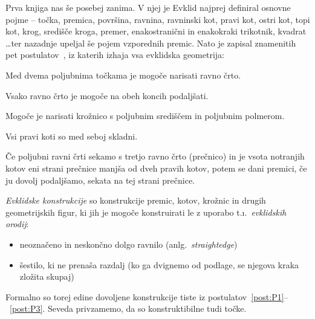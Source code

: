 Prva knjiga nas še posebej zanima. V njej je Evklid najprej definiral osnovne pojme -- točka, premica, površina, ravnina, ravninski kot, pravi kot, ostri kot, topi kot, krog, središče kroga, premer, enakostranični in enakokraki trikotnik, kvadrat \ldots ter nazadnje upeljal še pojem vzporednih premic. Nato je zapisal znamenitih pet postulatov~\cite{euclidI}, iz katerih izhaja vsa evklidska geometrija:

\begin{postulat}
    \label{post:P1}
    Med dvema poljubnima točkama je mogoče narisati ravno črto.
\end{postulat}
\begin{postulat}
    \label{post:P2}
    Vsako ravno črto je mogoče na obeh koncih podaljšati.
\end{postulat}
\begin{postulat}
    \label{post:P3}
    Mogoče je narisati krožnico s poljubnim središčem in poljubnim polmerom.
\end{postulat}
\begin{postulat}
    \label{post:P4}
    Vsi pravi koti so med seboj skladni.
\end{postulat}
\begin{postulat}
    \label{post:P5}
    Če poljubni ravni črti sekamo s tretjo ravno črto (prečnico) in je vsota notranjih kotov eni strani prečnice manjša od dveh pravih kotov, potem se dani premici, če ju dovolj podaljšamo, sekata na tej strani prečnice.
\end{postulat}

\emph{Evklidske konstrukcije} so konstrukcije premic, kotov, krožnic in drugih geometrijskih figur, ki jih je mogoče konstruirati le z uporabo t.\i.\ \emph{evklidskih orodij}:

\begin{itemize}
    \item neoznačeno in neskončno dolgo ravnilo (anlg.\ \emph{straightedge})
    \item šestilo, ki ne prenaša razdalj (ko ga dvignemo od podlage, se njegova kraka zložita skupaj)
\end{itemize}

Formalno so torej edine dovoljene konstrukcije tiste iz postulatov~\ref{post:P1}--~\ref{post:P3}. Seveda privzamemo, da so konstruktibilne tudi točke.

